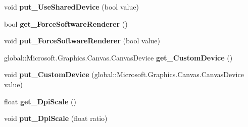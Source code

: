 \begin{DoxyCompactItemize}
void {\bfseries put\+\_\+\+Use\+Shared\+Device} (bool value)
\item 
\mbox{\label{class_microsoft_1_1_graphics_1_1_canvas_1_1_u_i_1_1_xaml_1_1_canvas_animated_control_a7832872f65d5600713fbe9a68d782b54}} 
bool {\bfseries get\+\_\+\+Force\+Software\+Renderer} ()
\item 
\mbox{\label{class_microsoft_1_1_graphics_1_1_canvas_1_1_u_i_1_1_xaml_1_1_canvas_animated_control_ae2443c631de1a00c1e44d680363acd45}} 
void {\bfseries put\+\_\+\+Force\+Software\+Renderer} (bool value)
\item 
\mbox{\label{class_microsoft_1_1_graphics_1_1_canvas_1_1_u_i_1_1_xaml_1_1_canvas_animated_control_a17fb6529b7f97cb7eec28db12e4e438b}} 
global\+::\+Microsoft.\+Graphics.\+Canvas.\+Canvas\+Device {\bfseries get\+\_\+\+Custom\+Device} ()
\item 
\mbox{\label{class_microsoft_1_1_graphics_1_1_canvas_1_1_u_i_1_1_xaml_1_1_canvas_animated_control_a78fcff8bd800e4cefb4b1a3e7fdf0bbb}} 
void {\bfseries put\+\_\+\+Custom\+Device} (global\+::\+Microsoft.\+Graphics.\+Canvas.\+Canvas\+Device value)
\item 
\mbox{\label{class_microsoft_1_1_graphics_1_1_canvas_1_1_u_i_1_1_xaml_1_1_canvas_animated_control_a0f7a2890504c7e9d2ed733f76f001880}} 
float {\bfseries get\+\_\+\+Dpi\+Scale} ()
\item 
\mbox{\label{class_microsoft_1_1_graphics_1_1_canvas_1_1_u_i_1_1_xaml_1_1_canvas_animated_control_a2d14da04c7f91c1074f1acd0e450c4b4}} 
void {\bfseries put\+\_\+\+Dpi\+Scale} (float ratio)
\item 
\mbox{\label{class_microsoft_1_1_graphics_1_1_canvas_1_1_u_i_1_1_xaml_1_1_canvas_animated_control_a21b8d49117017e05ba0ae216f1361829}} 

\end{DoxyCompactItemize}
